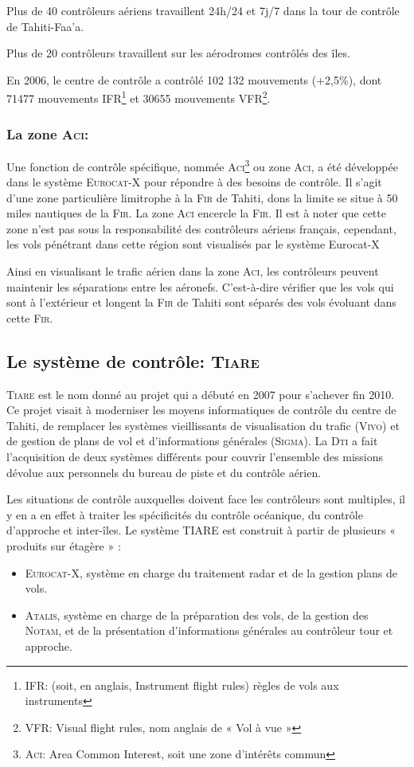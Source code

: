 Plus de 40 contrôleurs aériens travaillent 24h/24 et 7j/7 dans la tour de contrôle de Tahiti-Faa'a.

Plus de 20 contrôleurs travaillent sur les aérodromes contrôlés des îles.

En 2006, le centre de contrôle a contrôlé 102 132 mouvements (+2,5\%), dont 71477 mouvements \textsc{IFR}\footnote{IFR: (soit, en anglais, Instrument flight rules) règles de vols aux instruments} et 30655 mouvements \textsc{VFR}\footnote{VFR: Visual flight rules, nom anglais de « Vol à vue »}.

        \subsubsection{La zone \textsc{Aci}:\label{Aci}}
Une fonction de contrôle spécifique, nommée \textsc{Aci}\footnote{\textsc{Aci}: Area Common Interest, soit une zone d'intérêts commun} ou zone \textsc{Aci}, a été développée dans le système \textsc{Eurocat-X} pour répondre à des besoins de contrôle. Il s’agit d’une zone particulière limitrophe à la \textsc{Fir}  de Tahiti, dons la limite se situe à 50 miles nautiques de la \textsc{Fir}. La zone \textsc{Aci} encercle la \textsc{Fir}. Il est à noter que cette zone n’est pas sous la responsabilité des contrôleurs aériens français, cependant, les vols pénétrant dans cette région sont visualisés par le système Eurocat-X 

Ainsi en visualisant le trafic aérien dans la zone \textsc{Aci}, les contrôleurs peuvent maintenir les séparations entre les aéronefs. C'est-à-dire vérifier que les vols qui sont à l’extérieur et longent la \textsc{Fir} de Tahiti sont séparés des vols évoluant dans cette \textsc{Fir}.

    \subsection{Le système de contrôle: \textsc{Tiare}}
\textsc{Tiare} est le nom donné au projet qui a débuté en 2007 pour s'achever fin 2010. Ce projet visait à moderniser les moyens informatiques de contrôle du centre de Tahiti, de remplacer les systèmes vieillissants de visualisation du trafic (\textsc{Vivo}) et de gestion de plans de vol et d'informations générales (\textsc{Sigma}). La \textsc{Dti} a fait l'acquisition de deux systèmes différents pour couvrir l’ensemble des missions dévolue aux personnels du bureau de piste et du contrôle aérien.

Les situations de contrôle auxquelles doivent face les contrôleurs sont multiples, il y en a en effet à traiter les spécificités du contrôle océanique, du contrôle d’approche et inter-îles. Le système TIARE est construit à partir de plusieurs « produits sur étagère » :
\begin{itemize}
  \item \textsc{Eurocat-X}, système en charge du traitement radar et de la gestion plans de vols.
  \item \textsc{Atalis}, système en charge de la préparation des vols, de la gestion des \textsc{Notam}, et de la présentation d’informations générales au contrôleur tour et approche.
\end{itemize}\medskip

